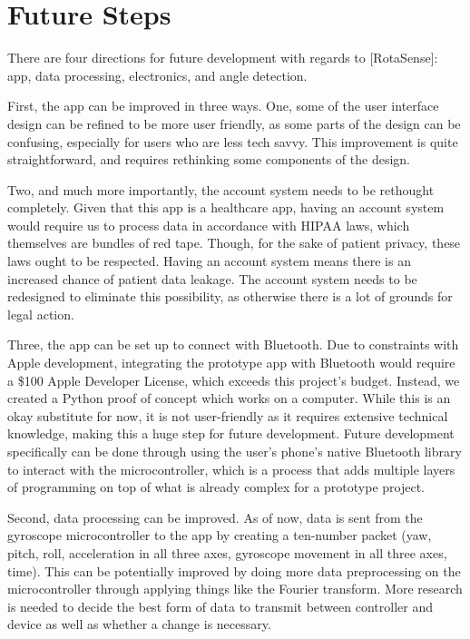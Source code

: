\chapter{Future Steps}
\label{chap:future}

There are four directions for future development with regards to [RotaSense]: app, data processing, electronics, and angle detection.

First, the app can be improved in three ways. One, some of the user interface design can be refined to be more user friendly, as some parts of the design can be confusing, especially for users who are less tech savvy. This improvement is quite straightforward, and requires rethinking some components of the design.

Two, and much more importantly, the account system needs to be rethought completely. Given that this app is a healthcare app, having an account system would require us to process data in accordance with HIPAA laws, which themselves are bundles of red tape. Though, for the sake of patient privacy, these laws ought to be respected. Having an account system means there is an increased chance of patient data leakage. The account system needs to be redesigned to eliminate this possibility, as otherwise there is a lot of grounds for legal action.

Three, the app can be set up to connect with Bluetooth. Due to constraints with Apple development, integrating the prototype app with Bluetooth would require a \$100 Apple Developer License, which exceeds this project’s budget. Instead, we created a Python proof of concept which works on a computer. While this is an okay substitute for now, it is not user-friendly as it requires extensive technical knowledge, making this a huge step for future development. Future development specifically can be done through using the user’s phone’s native Bluetooth library to interact with the microcontroller, which is a process that adds multiple layers of programming on top of what is already complex for a prototype project.

Second, data processing can be improved. As of now, data is sent from the gyroscope microcontroller to the app by creating a ten-number packet (yaw, pitch, roll, acceleration in all three axes, gyroscope movement in all three axes, time). This can be potentially improved by doing more data preprocessing on the microcontroller through applying things like the Fourier transform. More research is needed to decide the best form of data to transmit between controller and device as well as whether a change is necessary.

